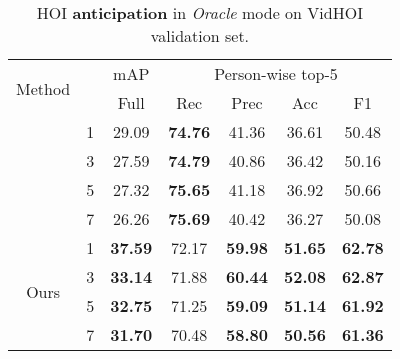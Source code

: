\documentclass[times,twocolumn,final,authoryear]{elsarticle}
\begin{document}
\begin{table}
    \centering
    \begin{subtable}[]{0.47\textwidth}
        \centering
        \small
        \begin{tabular}{|c|c|c|c c c c|}
            \hline
            \multirow{2}{*}{Method} & \multirow{2}{*}{} & mAP & \multicolumn{4}{c|}{Person-wise top-5} \\
            \cline{3-7}
            & & Full & Rec & Prec & Acc & F1 \\
            \hhline{|=|=|=|= = = =|}
            \multirow{4}{*}{STTran} & 1 & 29.09 & \textbf{74.76} & 41.36 & 36.61 & 50.48\\
            & 3 & 27.59 & \textbf{74.79} & 40.86 & 36.42 & 50.16\\
            & 5 & 27.32 & \textbf{75.65} & 41.18 & 36.92 & 50.66\\
            & 7 & 26.26 & \textbf{75.69} & 40.42 & 36.27 & 50.08\\
            \hline
            \multirow{4}{*}{Ours} & 1 & \textbf{37.59} & 72.17 & \textbf{59.98} & \textbf{51.65} & \textbf{62.78}\\
            & 3 & \textbf{33.14} & 71.88 & \textbf{60.44} & \textbf{52.08} & \textbf{62.87}\\
            & 5 & \textbf{32.75} & 71.25 & \textbf{59.09} & \textbf{51.14} & \textbf{61.92}\\
            & 7 & \textbf{31.70} & 70.48 & \textbf{58.80} & \textbf{50.56} & \textbf{61.36}\\
            \hline
        \end{tabular}
        \caption{HOI \textbf{anticipation} in \emph{Oracle} mode on VidHOI validation set.}
        \label{table:anticipation_oracle}
    \end{subtable}


\end{table}
\end{document}
